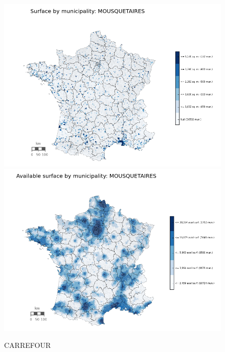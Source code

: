 \documentclass[11pt]{article}
\begin{document}
\begin{figure}[H]
    \caption{CARREFOUR}
	\centering
		\includegraphics[width=15cm]{images/maps_surface/MOUSQUETAIRES.png}
        \includegraphics[width=15cm]{images/maps_available_surface/MOUSQUETAIRES.png}
\end{figure}
\end{document}

